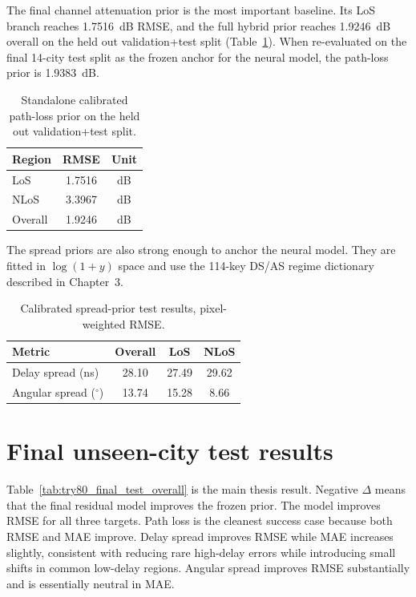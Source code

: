 The final channel attenuation prior is the most important baseline. Its LoS
branch reaches \SI{1.7516}{dB} RMSE, and the full hybrid prior reaches
\SI{1.9246}{dB} overall on the held out validation+test split
(Table~\ref{tab:try78_results}). When re-evaluated on the final 14-city test
split as the frozen anchor for the neural model, the path-loss prior is
\SI{1.9383}{dB}.

\begin{table}[htbp]
\centering
\caption{Standalone calibrated path-loss prior on the held out validation+test split.}
\label{tab:try78_results}
\scriptsize
\begin{tabular}{lcc}
\toprule
Region & RMSE & Unit \\
\midrule
LoS & 1.7516 & dB \\
NLoS & 3.3967 & dB \\
Overall & 1.9246 & dB \\
\bottomrule
\end{tabular}
\end{table}

The spread priors are also strong enough to anchor the neural model. They are
fitted in \(\log(1+y)\) space and use the 114-key DS/AS regime dictionary
described in Chapter~3.

\begin{table}[htbp]
\centering
\caption{Calibrated spread-prior test results, pixel-weighted RMSE.}
\label{tab:try79_results}
\scriptsize
\begin{tabular}{lccc}
\toprule
Metric & Overall & LoS & NLoS \\
\midrule
Delay spread (ns) & 28.10 & 27.49 & 29.62 \\
Angular spread (\(^\circ\)) & 13.74 & 15.28 & 8.66 \\
\bottomrule
\end{tabular}
\end{table}

\section{Final unseen-city test results}

Table~\ref{tab:try80_final_test_overall} is the main thesis result. Negative
\(\Delta\) means that the final residual model improves the frozen prior. The
model improves RMSE for all three targets. Path loss is the cleanest success
case because both RMSE and MAE improve. Delay spread improves RMSE while MAE
increases slightly, consistent with reducing rare high-delay errors while
introducing small shifts in common low-delay regions. Angular spread improves
RMSE substantially and is essentially neutral in MAE.

